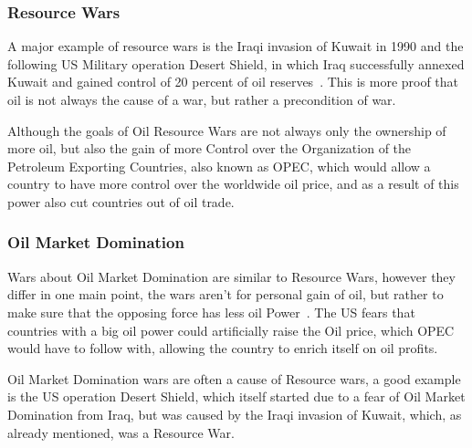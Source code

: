 \subsubsection{Resource Wars}
A major example of resource wars is the Iraqi invasion of Kuwait in 1990 and the following US Military operation Desert Shield, in which Iraq successfully annexed Kuwait and gained control of 20 percent of oil reserves~\autocite{history-iraq-kuwait}. This is more proof that oil is not always the cause of a war, but rather a precondition of war.

Although the goals of Oil Resource Wars are not always only the ownership of more oil, but also the gain of more Control over the Organization of the Petroleum Exporting Countries, also known as OPEC, which would allow a country to have more control over the worldwide oil price, and as a result of this power also cut countries out of oil trade.

\subsubsection{Oil Market Domination}
Wars about Oil Market Domination are similar to Resource Wars, however they differ in one main point, the wars aren't for personal gain of oil, but rather to make sure that the opposing force has less oil Power~\autocite{fueling-fire-jeff-d}. The US fears that countries with a big oil power could artificially raise the Oil price, which OPEC would have to follow with, allowing the country to enrich itself on oil profits.

Oil Market Domination wars are often a cause of Resource wars, a good example is the US operation Desert Shield, which itself started due to a fear of Oil Market Domination from Iraq, but was caused by the Iraqi invasion of Kuwait, which, as already mentioned, was a Resource War.
